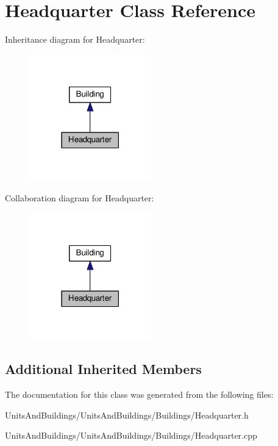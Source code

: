 \hypertarget{class_headquarter}{}\section{Headquarter Class Reference}
\label{class_headquarter}


Inheritance diagram for Headquarter\+:
\nopagebreak
\begin{figure}[H]
\begin{center}
\leavevmode
\includegraphics[width=150pt]{class_headquarter__inherit__graph}
\end{center}
\end{figure}


Collaboration diagram for Headquarter\+:
\nopagebreak
\begin{figure}[H]
\begin{center}
\leavevmode
\includegraphics[width=150pt]{class_headquarter__coll__graph}
\end{center}
\end{figure}
\subsection*{Additional Inherited Members}


The documentation for this class was generated from the following files\+:\begin{DoxyCompactItemize}
\item 
Units\+And\+Buildings/\+Units\+And\+Buildings/\+Buildings/Headquarter.\+h\item 
Units\+And\+Buildings/\+Units\+And\+Buildings/\+Buildings/Headquarter.\+cpp\end{DoxyCompactItemize}
